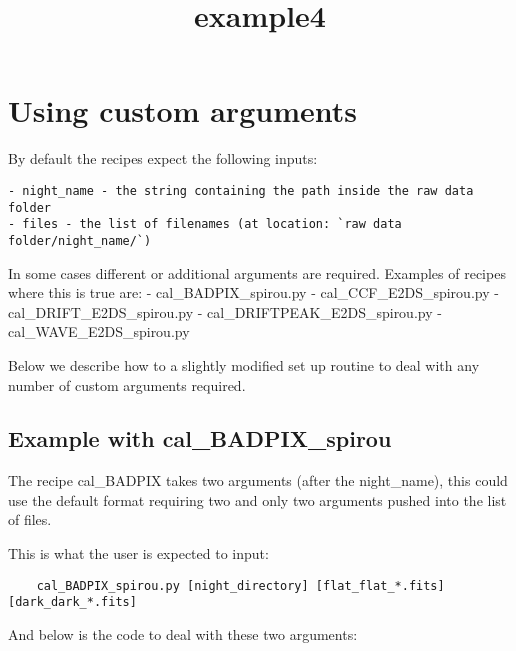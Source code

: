 \documentclass[11pt]{article}
\title{example4}
\begin{document}
    
    
    \maketitle
    
    

    
    \section{Using custom arguments}\label{using-custom-arguments}

By default the recipes expect the following inputs:

\begin{verbatim}
- night_name - the string containing the path inside the raw data folder
- files - the list of filenames (at location: `raw data folder/night_name/`)
\end{verbatim}

In some cases different or additional arguments are required. Examples
of recipes where this is true are: - cal\_BADPIX\_spirou.py -
cal\_CCF\_E2DS\_spirou.py - cal\_DRIFT\_E2DS\_spirou.py -
cal\_DRIFTPEAK\_E2DS\_spirou.py - cal\_WAVE\_E2DS\_spirou.py

Below we describe how to a slightly modified set up routine to deal with
any number of custom arguments required.

    \subsection{Example with
cal\_BADPIX\_spirou}\label{example-with-cal_badpix_spirou}

The recipe cal\_BADPIX takes two arguments (after the night\_name), this
could use the default format requiring two and only two arguments pushed
into the list of files.

This is what the user is expected to input:

\begin{verbatim}
    cal_BADPIX_spirou.py [night_directory] [flat_flat_*.fits] [dark_dark_*.fits]
\end{verbatim}

And below is the code to deal with these two arguments:
\end{document}
